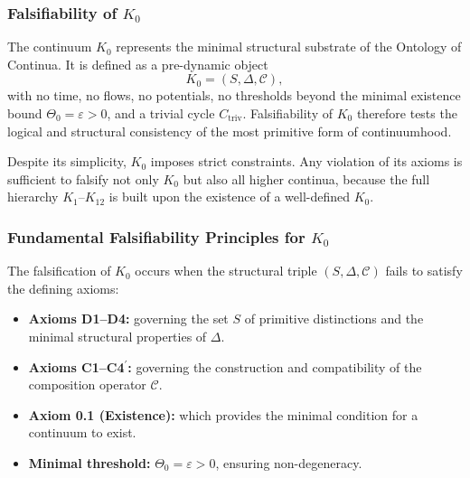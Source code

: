 
\subsubsection{Falsifiability of \texorpdfstring{$K_0$}{K_0}}
\label{sec:falsifiability-k0}

The continuum $K_0$ represents the minimal structural substrate of the
Ontology of Continua.
It is defined as a pre-dynamic object
\[
K_0 = (S,\Delta,\mathcal{C}),
\]
with no time, no flows, no potentials, no thresholds beyond the minimal
existence bound $\Theta_0=\varepsilon>0$, and a trivial cycle
$C_{\mathrm{triv}}$.
Falsifiability of $K_0$ therefore tests the logical and structural
consistency of the most primitive form of continuumhood.

Despite its simplicity, $K_0$ imposes strict constraints.
Any violation of its axioms is sufficient to falsify not only $K_0$
but also all higher continua, because the full hierarchy
$K_1$–$K_{12}$ is built upon the existence of a well-defined $K_0$.



\subsubsection{Fundamental Falsifiability Principles for \texorpdfstring{$K_0$}{K_0}}

The falsification of $K_0$ occurs when the structural triple
$(S,\Delta,\mathcal{C})$ fails to satisfy the defining axioms:

\begin{itemize}
    \item \textbf{Axioms D1–D4:}
          governing the set $S$ of primitive distinctions and the
          minimal structural properties of $\Delta$.

    \item \textbf{Axioms C1–C4$^\prime$:}
          governing the construction and compatibility of the
          composition operator $\mathcal{C}$.

    \item \textbf{Axiom 0.1 (Existence):}
          which provides the minimal condition for a continuum to exist.

    \item \textbf{Minimal threshold:}
          $\Theta_0 = \varepsilon > 0$, ensuring non-degeneracy.
\end{itemize}

